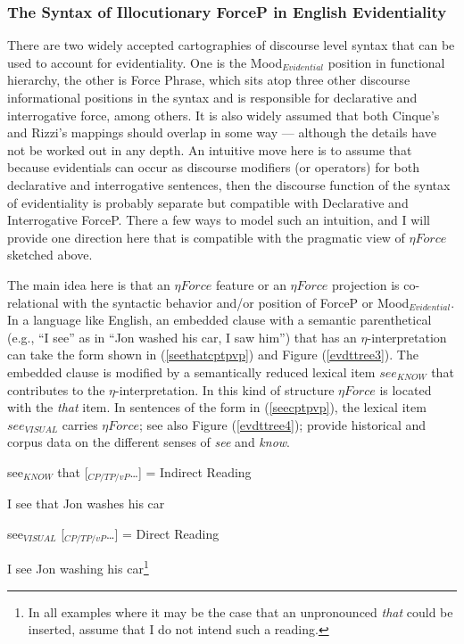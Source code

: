 \documentclass[11pt]{article}
\begin{document}
\subsubsection{The Syntax of Illocutionary ForceP in English Evidentiality}
There are two widely accepted cartographies of discourse level syntax that can be used to account for evidentiality. One is the Mood$_{Evidential}$ position in  functional hierarchy, the other is  Force Phrase, which sits atop three other discourse informational positions in the syntax and is responsible for declarative and interrogative force, among others. It is also widely assumed that both Cinque's and Rizzi's mappings should overlap in some way --- although the details have not be worked out in any depth. An intuitive move here is to assume that because evidentials can occur as discourse modifiers (or operators) for both declarative and interrogative sentences, then the discourse function of the syntax of evidentiality is probably separate but compatible with Declarative and Interrogative ForceP. There a few ways to model such an intuition, and I will provide one direction here that is compatible with the pragmatic view of $\eta Force$ sketched above.

The main idea here is that an $\eta Force$ feature or an $\eta Force$ projection is co-relational with the syntactic behavior and/or position of ForceP or Mood$_{Evidential}$. In a language like English, an embedded clause with a semantic parenthetical  (e.g., ``I see'' as in ``Jon washed his car, I saw him'') that has an $\eta$-interpretation can take the form shown in (\ref{seethatcptpvp}) and Figure (\ref{evdttree3}). The embedded clause is modified by a semantically reduced lexical item $see_{KNOW}$ that contributes to the $\eta$-interpretation. In this kind of structure $\eta Force$ is located with the {\sl that} item. In sentences of the form in (\ref{seecptpvp}), the lexical item $see_{VISUAL}$ carries $\eta Force$; see also Figure (\ref{evdttree4}); \cite{gisborneholmes:2007} provide historical and corpus data on the different senses of {\it see} and {\it know}.
 

\begin{exe}
\ex \lb{\eta} see$_{KNOW}$ that [$_{CP/TP/vP}$\ldots ]\rb{} = Indirect Reading \label{seethatcptpvp} 
\begin{xlist}
\ex I see that Jon washes his car
\end{xlist}
\ex \lb{\eta} see$_{VISUAL}$ [$_{CP/TP/vP}$\ldots ]\rb{} = Direct Reading \label{seecptpvp}
\begin{xlist}
\ex I see Jon washing his car\footnote{In all examples where it may be the case that an unpronounced {\sl that} could be inserted, assume that I do not intend such a reading.}
\end{xlist}    
\end{exe}
\end{document}
